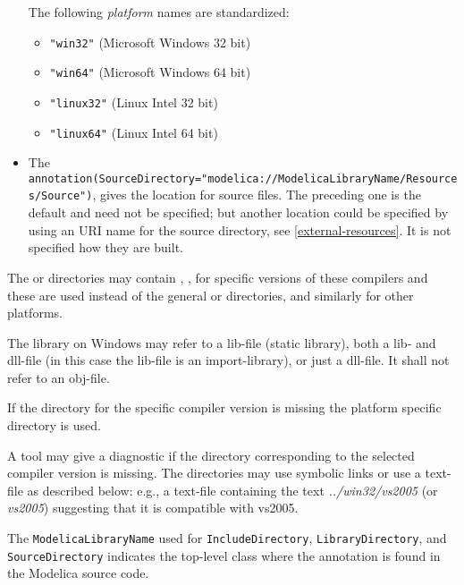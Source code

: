 \begin{itemize}
  The following \emph{platform} names are standardized:
  \begin{itemize}
  \item
    {\lstinline!"win32"!} (Microsoft Windows 32 bit)
  \item
    {\lstinline!"win64"!} (Microsoft Windows 64 bit)
  \item
    {\lstinline!"linux32"!} (Linux Intel 32 bit)
  \item
    {\lstinline!"linux64"!} (Linux Intel 64 bit)
  \end{itemize}
\item
  The
  {\lstinline!annotation(SourceDirectory="modelica://ModelicaLibraryName/Resources/Source")!}, gives the location for source files.
  The preceding one is the default and need not be specified; but another location could be specified by using an URI name for the source directory, see \cref{external-resources}.
  It is not specified how they are built.
\end{itemize}

The  or  directories may contain , , 
for specific versions of these compilers and these are used instead of
the general  or  directories, and similarly for other
platforms.

The library on Windows may refer to a lib-file (static library), both a lib- and dll-file (in this case the lib-file is an import-library),
or just a dll-file. It shall not refer to an obj-file.

If the directory for the specific compiler version is missing the
platform specific directory is used.

\begin{nonnormative}
A tool may give a diagnostic if the directory corresponding to the selected compiler version is missing.
The directories may use symbolic links or use a text-file as described below: e.g., a text-file  containing the text \emph{../win32/vs2005} (or \emph{vs2005}) suggesting that it is compatible with vs2005.
\end{nonnormative}

The {\lstinline!ModelicaLibraryName!} used for {\lstinline!IncludeDirectory!}, {\lstinline!LibraryDirectory!}, and {\lstinline!SourceDirectory!} indicates the top-level class where the annotation is found in the Modelica source code.

